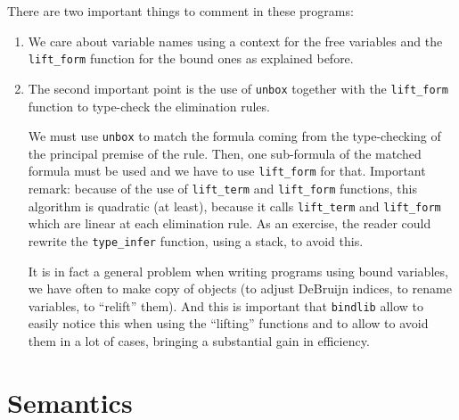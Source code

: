 \documentclass[11pt]{article}
\begin{document}
There are two important things to comment in these programs:
\begin{enumerate}
\item We care about variable names using a context for the free
  variables and the \verb#lift_form# function for the bound ones as explained
  before.

\item The second important point is the use of \verb#unbox# together
with the \verb#lift_form# function to type-check the elimination rules.

We must use \verb#unbox# to match the formula coming from the
type-checking of the principal premise of the rule. Then, one
sub-formula of the matched formula must be used and we have to use
\verb#lift_form# for that.
Important remark: because of the use of \verb#lift_term# and
\verb#lift_form# functions, this algorithm is quadratic (at least), because
it calls \verb#lift_term# and \verb#lift_form# which are linear at
each elimination rule. As an exercise, the reader could rewrite the
\verb#type_infer# function, using a stack, to avoid this.

It is in fact a general problem when writing programs using bound
variables, we have often to make copy of objects (to adjust DeBruijn
indices, to rename variables, to ``relift'' them). And this is
important that \verb#bindlib# allow to easily notice this when using
the ``lifting'' functions and to allow to avoid them in a lot of cases,
bringing a substantial gain in efficiency.
\end{enumerate}

\appendix



\section{Semantics}
\end{document}
